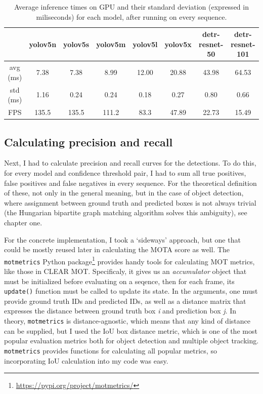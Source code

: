 \begin{table}[h]
    \begin{tabular}{|c|c|c|c|c|c|c|c|}
        \hline
         & yolov5n & yolov5s & yolov5m & yolov5l & yolov5x & detr-resnet-50 & detr-resnet-101 \\
        \hline
        \hline
        avg (ms) & 7.38 & 7.38 & 8.99 & 12.00 & 20.88 & 43.98 & 64.53 \\
        \hline
        std (ms) & 1.16 & 0.24 & 0.24 & 0.18 & 0.27 & 0.80 & 0.66 \\
        \hline
        \hline
            FPS & 135.5 & 135.5 & 111.2 & 83.3 & 47.89 & 22.73 & 15.49 \\
        \hline
    \end{tabular}
    \caption{Average inference times on GPU and their standard deviation (expressed in miliseconds) for each model, after running on every sequence.}
    \label{tab:inference-times}
\end{table}

\subsection{Calculating precision and recall}

Next, I had to calculate precision and recall curves for the detections. To do this, for every model and confidence threshold pair, I had to sum all true positives, false positives and false negatives in every sequence. For the theoretical definition of these, not only in the general meaning, but in the case of object detection, where assignment between ground truth and predicted boxes is not always trivial (the Hungarian bipartite graph matching algorithm solves this ambiguity), see chapter one.

For the concrete implementation, I took a `sideways' approach, but one that could be mostly reused later in calculating the MOTA score as well. The \verb|motmetrics| Python package\footnote{\url{https://pypi.org/project/motmetrics/}} provides handy tools for calculating MOT metrics, like those in CLEAR MOT. Specificaly, it gives us an \textit{accumulator} object that must be initialized before evaluating on a seqence, then for each frame, its \verb|update()| function must be called to update its state. In the arguments, one must provide ground truth IDs and predicted IDs, as well as a distance matrix that expresses the distance between ground truth box \textit{i} and prediction box \textit{j}. In theory, \verb|motmetrics| is distance-agnostic, which means that any kind of distance can be supplied, but I used the IoU box distance metric, which is one of the most popular evaluation metrics both for object detection and multiple object tracking. \verb|motmetrics| provides functions for calculating all popular metrics, so incorporating IoU calculation into my code was easy.

